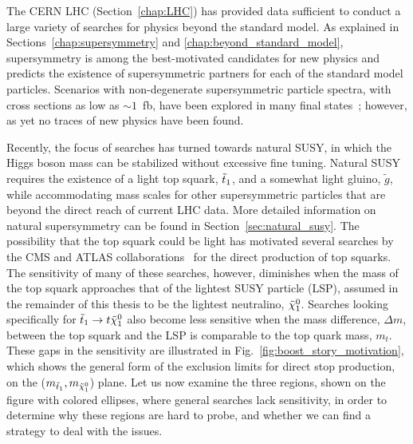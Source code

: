 

The CERN LHC (Section~\ref{chap:LHC}) has provided data sufficient to conduct a large variety of
searches for physics beyond the standard model.
As explained in Sections~\ref{chap:supersymmetry} and \ref{chap:beyond_standard_model},
supersymmetry is among the best-motivated candidates for new physics and predicts the existence of
supersymmetric partners for each of the standard model particles.  
Scenarios with non-degenerate supersymmetric particle spectra, with cross sections as low as
${\sim}1$~fb, have been explored in many final states~\cite{CMS-PAS-SUS-13-020}; however, as yet no
traces of new physics have been found.  

Recently, the focus of searches has turned towards natural SUSY, in which the Higgs boson mass can
be stabilized without excessive fine tuning. Natural SUSY requires the existence of a light top
squark, $\tilde{t}_1$, and a somewhat light gluino, $\tilde{g}$, while accommodating mass scales for
other supersymmetric particles that are beyond the direct reach of current LHC data.  
More detailed information on natural supersymmetry can be found in Section~\ref{sec:natural_susy}. 
The possibility that the top squark could be light has motivated several searches by the CMS and
ATLAS
collaborations~\cite{Aad:2013ija,Aad:2014qaa,Aad:2014bva,Aad:2014kva,Aad:2014kra,Chatrchyan:2013xna,
Chatrchyan:2013mya,Khachatryan:2014doa} for the direct production of top squarks. The sensitivity of
many of these searches, however, diminishes when the mass of the top squark approaches that of the
lightest SUSY particle (LSP), assumed in the remainder of this thesis to be the lightest neutralino,
$\tilde{\chi}_1^0$. Searches looking specifically for $\tilde{t}_1 \rightarrow t \tilde{\chi}_1^0$ also become less sensitive
when the mass difference, $\Delta m$, between the top squark and the LSP is comparable to the top
quark mass, $m_t$. 
These gaps in the sensitivity are illustrated in Fig.~\ref{fig:boost_story_motivation}, which shows
the general form of the exclusion limits for direct stop production, on the
($m_{\tilde{t}_1},m_{\tilde{\chi}_1^0}$) plane. 
Let us now examine the three regions, shown on the figure with colored ellipses, where general
searches lack sensitivity, in order to determine why these regions are hard to probe, and whether we
can find a strategy to deal with the issues. 

